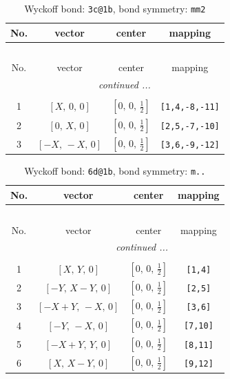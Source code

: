 \documentclass[fleqn,8pt]{jsarticle}
\begin{document}
\begin{longtable}{cccc}
\caption{Wyckoff bond: {\tt 3c@1b}, bond symmetry: {\tt mm2}}
 \\
 \hline \hline
No. & vector & center & mapping \\ \hline \endfirsthead

\multicolumn{3}{l}{\tablename\ \thetable{}} \\
 \hline \hline
No. & vector & center & mapping \\ \hline \endhead

 \hline \hline
\multicolumn{3}{r}{\footnotesize\it continued ...} \\ \endfoot

 \hline \hline
\multicolumn{3}{r}{} \\ \endlastfoot

1 & $\left[ X,\, 0,\, 0 \right]$ & $\left[ 0,\, 0,\, \frac{1}{2} \right]$ & {\tt [1,4,-8,-11]} \\ \hline
2 & $\left[ 0,\, X,\, 0 \right]$ & $\left[ 0,\, 0,\, \frac{1}{2} \right]$ & {\tt [2,5,-7,-10]} \\ \hline
3 & $\left[ - X,\, - X,\, 0 \right]$ & $\left[ 0,\, 0,\, \frac{1}{2} \right]$ & {\tt [3,6,-9,-12]} \\
\end{longtable}
\renewcommand{\arraystretch}{1.2}
\begin{longtable}{cccc}
\caption{Wyckoff bond: {\tt 6d@1b}, bond symmetry: {\tt m..}}
 \\
 \hline \hline
No. & vector & center & mapping \\ \hline \endfirsthead

\multicolumn{3}{l}{\tablename\ \thetable{}} \\
 \hline \hline
No. & vector & center & mapping \\ \hline \endhead

 \hline \hline
\multicolumn{3}{r}{\footnotesize\it continued ...} \\ \endfoot

 \hline \hline
\multicolumn{3}{r}{} \\ \endlastfoot

1 & $\left[ X,\, Y,\, 0 \right]$ & $\left[ 0,\, 0,\, \frac{1}{2} \right]$ & {\tt [1,4]} \\ \hline
2 & $\left[ - Y,\, X - Y,\, 0 \right]$ & $\left[ 0,\, 0,\, \frac{1}{2} \right]$ & {\tt [2,5]} \\ \hline
3 & $\left[ - X + Y,\, - X,\, 0 \right]$ & $\left[ 0,\, 0,\, \frac{1}{2} \right]$ & {\tt [3,6]} \\ \hline
4 & $\left[ - Y,\, - X,\, 0 \right]$ & $\left[ 0,\, 0,\, \frac{1}{2} \right]$ & {\tt [7,10]} \\ \hline
5 & $\left[ - X + Y,\, Y,\, 0 \right]$ & $\left[ 0,\, 0,\, \frac{1}{2} \right]$ & {\tt [8,11]} \\ \hline
6 & $\left[ X,\, X - Y,\, 0 \right]$ & $\left[ 0,\, 0,\, \frac{1}{2} \right]$ & {\tt [9,12]} \\
\end{longtable}
\end{document}
